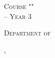 \begin{titlepage}
	\centering
	{\scshape\huge \university\par}
    
	\vspace{0.5cm}
	{\scshape\Large \faculty\par}
    
	\vspace{0.8cm}
	{\scshape\Large Course "\coursename" \\ \coursecode{} --  Year 3\par}
    
    \vspace{3.2cm}
	{\huge \sf \textbf{\reporttitle}\par}
    
	\vspace{0.6cm}
    {\scshape\large  \reportsubtitle \par}
	
	\vspace{5.4cm}
    {\scshape\Large Department of \subgroup \par}
    {\scshape\Large \group{} \par}
	\vspace{0.2cm}
	
     {\groupmembers \par}

	\vfill
	{\large \place, \sessiondate \par}
\end{titlepage}
